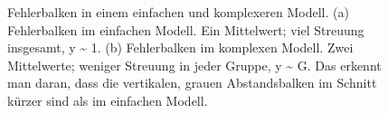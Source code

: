 \documentclass[
  letterpaper,
  oneside,
  open=any]{scrbook}
\theoremstyle{definition}
\theoremstyle{definition}
\theoremstyle{definition}
\theoremstyle{remark}
\begin{document}
\begin{figure}

\begin{minipage}{0.50\linewidth}



\end{minipage}%
%
\begin{minipage}{0.50\linewidth}



\end{minipage}%

\caption{\label{fig-fehler-red}Fehlerbalken in einem einfachen und
komplexeren Modell. (a) Fehlerbalken im einfachen Modell. Ein
Mittelwert; viel Streuung insgesamt, y \textasciitilde{} 1. (b)
Fehlerbalken im komplexen Modell. Zwei Mittelwerte; weniger Streuung in
jeder Gruppe, y \textasciitilde{} G. Das erkennt man daran, dass die
vertikalen, grauen Abstandsbalken im Schnitt kürzer sind als im
einfachen Modell.}

\end{figure}%
\end{document}

